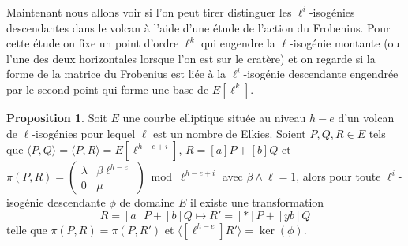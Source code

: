 \documentclass[10pt,a4paper]{book}
\theoremstyle{plain}
\theoremstyle{definition}
\theoremstyle{definition}
\theoremstyle{definition}
\newtheorem{prop}[thm]{Proposition}
\theoremstyle{definition}
\theoremstyle{remark}
\theoremstyle{remark}
\theoremstyle{definition}
\begin{document}
Maintenant nous allons voir si l'on peut tirer distinguer les 
$\ell^i$-isogénies descendantes dans le volcan à l'aide d'une étude de l'action
du Frobenius. Pour cette étude on fixe un point d'ordre $\ell^k$ qui engendre 
la $\ell$-isogénie montante (ou l'une des deux horizontales lorsque l'on est 
sur le cratère) et on regarde si la forme de la matrice du Frobenius est liée à
la $\ell^i$-isogénie descendante engendrée par le second point qui forme une 
base de $E[\ell^k]$.  


\begin{prop}
\label{pro:etu:atk:elk}
Soit $E$ une courbe elliptique située au niveau $h-e$ d'un volcan de 
$\ell$-isogénies pour lequel $\ell$ est un nombre de Elkies. Soient $P,Q, R 
\in E$ tels que $\langle P,Q \rangle= \langle P,R \rangle =E[\ell^{h-e+i}]$, 
$R=[a]P+[b]Q$ et $\pi(P,R)= \left( \begin{matrix}\lambda & \beta 
\ell^{h-e} \\0 & \mu \end{matrix}\right) \bmod \ell^{h-e+i}$ avec $\beta \wedge
\ell=1$, alors pour toute $\ell^i$-isogénie descendante $\phi$ de domaine $E$ il
existe une transformation \begin{equation*}
R=[a]P+[b]Q \mapsto R'=[*]P+[yb]Q
\end{equation*}
telle que $\pi(P,R)=\pi(P,R')$ et $\langle [\ell^{h-e}]R' \rangle = \ker(\phi)$.
\end{prop}
\end{document}
